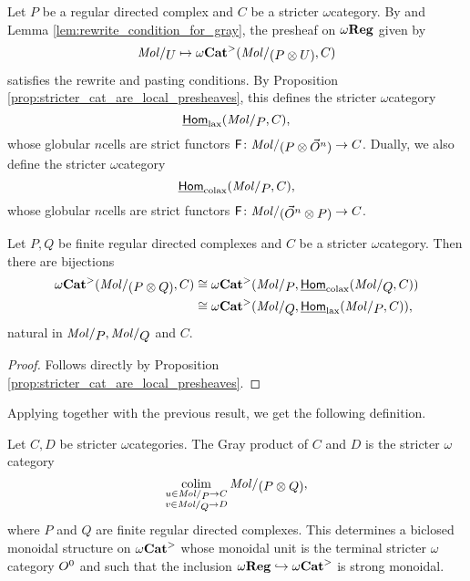 \begin{dfn} 
    Let \( P \) be a regular directed complex and \( C \) be a stricter \( \omega \)\nbd category.
    By \cite[Lemma 7.2.8]{hadzihasanovic2024combinatorics} and Lemma \ref{lem:rewrite_condition_for_gray}, the presheaf on \( \omega\mathbf{Reg} \) given by
    \begin{equation*}
        \molecin{U} \mapsto \somegaCat(\molecin{(P \gray U)}, C) 
    \end{equation*}
    satisfies the rewrite and pasting conditions.
    By Proposition \ref{prop:stricter_cat_are_local_presheaves}, this defines the stricter \( \omega \)\nbd category 
    \begin{equation*}
        \homlax(\molecin{P}, C),
    \end{equation*}
    whose globular \( n \)\nbd cells are strict functors \( \F \colon \molecin{(P \gray \dglobe{n})} \to C \).
    Dually, we also define the stricter \( \omega \)\nbd category
    \begin{equation*}
        \homcolax(\molecin{P}, C),
    \end{equation*}
    whose globular \( n \)\nbd cells are strict functors \( \F \colon \molecin{(\dglobe{n} \gray P)} \to C \).
\end{dfn}

\begin{lem}
    Let \( P, Q \) be finite regular directed complexes and \( C \) be a stricter \( \omega \)\nbd category.
    Then there are bijections
    \begin{align*}
        \somegaCat(\molecin{(P \gray Q)}, C) &\cong \somegaCat(\molecin{P}, \homcolax(\molecin{Q}, C)) \\
                                             &\cong \somegaCat(\molecin{Q}, \homlax(\molecin{P}, C)),
    \end{align*}
    natural in \( \molecin{P}, \molecin{Q} \) and \( C \).
\end{lem}
\begin{proof}
    Follows directly by Proposition \ref{prop:stricter_cat_are_local_presheaves}.
\end{proof}

\noindent Applying \cite[Th\'eor\`eme 5.3]{ara2020joint} together with the previous result, we get the following definition.
\begin{dfn}  \label{dfn:gray_product_stricter_categories}
    Let \( C, D \) be stricter \( \omega \)\nbd categories.
    The Gray product of \( C \) and \( D \) is the stricter \( \omega \)\nbd category
    \begin{equation*}
        \colim_{\substack{u \in \molecin{P} \to C \\ v \in\molecin{Q} \to D}} \molecin{(P \gray Q)},
    \end{equation*}
    where \( P \) and \( Q \) are finite regular directed complexes.
    This determines a biclosed monoidal structure on \( {\omega\mathbf{Cat}}^> \) whose monoidal unit is the terminal stricter \( \omega \)\nbd category \( O^{0} \) and such that the inclusion \( \omega\mathbf{Reg} \hookrightarrow {\omega\mathbf{Cat}}^> \) is strong monoidal.
\end{dfn}

